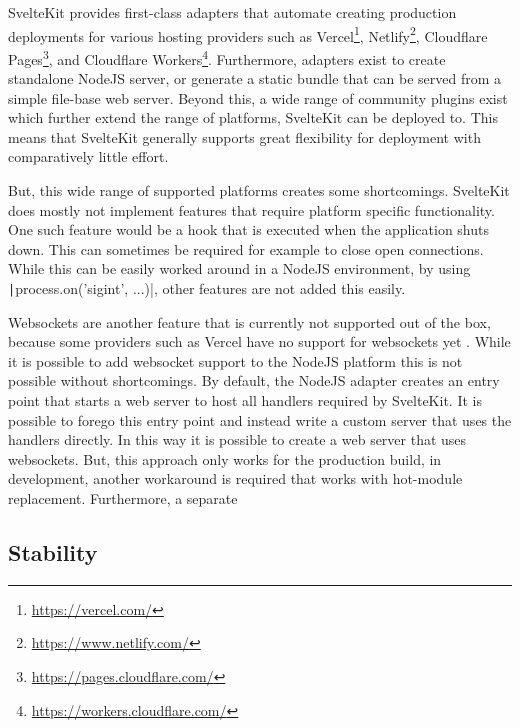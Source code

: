 SvelteKit provides first-class adapters that automate creating production deployments for various hosting providers such as Vercel\footnote{\url{https://vercel.com/}}, Netlify\footnote{\url{https://www.netlify.com/}}, Cloudflare Pages\footnote{\url{https://pages.cloudflare.com/}}, and Cloudflare Workers\footnote{\url{https://workers.cloudflare.com/}}. Furthermore, adapters exist to create standalone NodeJS server, or generate a static bundle that can be served from a simple file-base web server. Beyond this, a wide range of community plugins exist which further extend the range of platforms, SvelteKit can be deployed to. This means that SvelteKit generally supports great flexibility for deployment with comparatively little effort.  

But, this wide range of supported platforms creates some shortcomings. SvelteKit does mostly not implement features that require platform specific functionality. One such feature would be a hook that is executed when the application shuts down. This can sometimes be required for example to close open connections. While this can be easily worked around in a NodeJS environment, by using \texttt|process.on('sigint', ...)|, other features are not added this easily. 

Websockets are another feature that is currently not supported out of the box, because some providers such as Vercel have no support for websockets yet \cite{noauthor_vercel_nodate}. While it is possible to add websocket support to the NodeJS platform this is not possible without shortcomings. By default, the NodeJS adapter creates an entry point that starts a web server to host all handlers required by SvelteKit. It is possible to forego this entry point and instead write a custom server that uses the handlers directly. In this way it is possible to create a web server that uses websockets. But, this approach only works for the production build, in development, another workaround is required that works with hot-module replacement. Furthermore, a separate 



\subsection{Stability}


